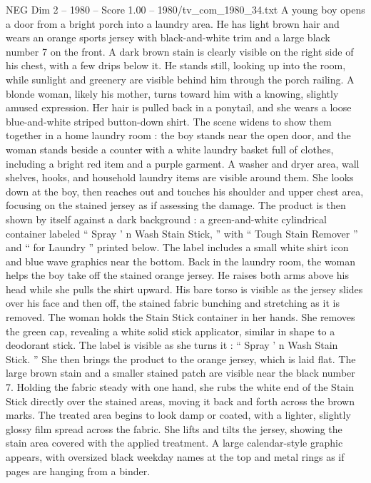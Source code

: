 \begin{textsample}{NEG Dim 2 – 1980 – Score 1.00 – 1980/tv\_com\_1980\_34.txt}  \label{ex:f2_neg_040}
A young boy opens a door from a bright porch into a laundry area.
He has light brown hair and wears an orange sports jersey with black-and-white trim and a large black number 7 on the front.
A dark brown stain is clearly visible on the right side of his chest, with a few drips below it.
He stands still, looking up into the room, while sunlight and greenery are visible behind him through the porch railing.
A blonde woman, likely his mother, turns toward him with a knowing, slightly amused expression.
Her hair is pulled back in a ponytail, and she wears a loose blue-and-white striped button-down shirt.
The scene widens to show them together in a home laundry room : the boy stands near the open door, and the woman stands beside a counter with a white laundry basket full of clothes, including a bright red item and a purple garment.
A washer and dryer area, wall shelves, hooks, and household laundry items are visible around them.
She looks down at the boy, then reaches out and touches his shoulder and upper chest area, focusing on the stained jersey as if assessing the damage.
The product is then shown by itself against a dark background : a green-and-white cylindrical container labeled “ Spray ’ n Wash Stain Stick, ” with “ Tough Stain Remover ” and “ for Laundry ” printed below.
The label includes a small white shirt icon and blue wave graphics near the bottom.
Back in the laundry room, the woman helps the boy take off the stained orange jersey.
He raises both arms above his head while she pulls the shirt upward.
His bare torso is visible as the jersey slides over his face and then off, the stained fabric bunching and stretching as it is removed.
The woman holds the Stain Stick container in her hands.
She removes the green cap, revealing a white solid stick applicator, similar in shape to a deodorant stick.
The label is visible as she turns it : “ Spray ’ n Wash Stain Stick. ” She then brings the product to the orange jersey, which is laid flat.
The large brown stain and a smaller stained patch are visible near the black number 7.
Holding the fabric steady with one hand, she rubs the white end of the Stain Stick directly over the stained areas, moving it back and forth across the brown marks.
The treated area begins to look damp or coated, with a lighter, slightly glossy film spread across the fabric.
She lifts and tilts the jersey, showing the stain area covered with the applied treatment.
A large calendar-style graphic appears, with oversized black weekday names at the top and metal rings as if pages are hanging from a binder.

\end{textsample}
